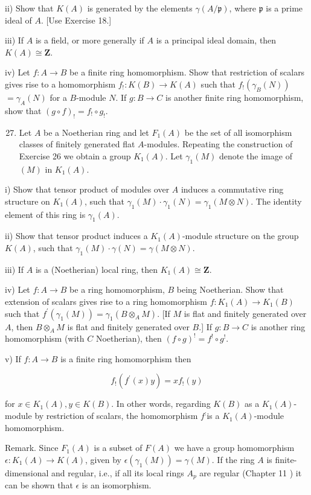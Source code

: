 \documentclass{standalone}
\theoremstyle{definition}
\theoremstyle{remark}
\begin{document}
ii) Show that $K(A)$ is generated by the elements $\gamma(A / \mathfrak{p})$, where $\mathfrak{p}$ is a prime ideal of $A$. [Use Exercise 18.]

iii) If $A$ is a field, or more generally if $A$ is a principal ideal domain, then $K(A) \cong \mathbf{Z}$.

iv) Let $f: A \rightarrow B$ be a finite ring homomorphism. Show that restriction of scalars gives rise to a homomorphism $f_{!}: K(B) \rightarrow K(A)$ such that $f_{!}\left(\gamma_{B}(N)\right)$ $=\gamma_{A}(N)$ for a $B$-module $N$. If $g: B \rightarrow C$ is another finite ring homomorphism, show that $(g \circ f)_{!}=f_{!} \circ g_{!}$.

\begin{enumerate}
  \setcounter{enumi}{26}
  \item Let $A$ be a Noetherian ring and let $F_{1}(A)$ be the set of all isomorphism classes of finitely generated flat $A$-modules. Repeating the construction of Exercise 26 we obtain a group $K_{1}(A)$. Let $\gamma_{1}(M)$ denote the image of $(M)$ in $K_{1}(A)$.
\end{enumerate}

i) Show that tensor product of modules over $A$ induces a commutative ring structure on $K_{1}(A)$, such that $\gamma_{1}(M) \cdot \gamma_{1}(N)=\gamma_{1}(M \otimes N)$. The identity element of this ring is $\gamma_{1}(A)$.

ii) Show that tensor product induces a $K_{1}(A)$-module structure on the group $K(A)$, such that $\gamma_{1}(M) \cdot \gamma(N)=\gamma(M \otimes N)$.

iii) If $A$ is a (Noetherian) local ring, then $K_{1}(A) \cong \mathbf{Z}$.

iv) Let $f: A \rightarrow B$ be a ring homomorphism, $B$ being Noetherian. Show that extension of scalars gives rise to a ring homomorphism $f: K_{1}(A) \rightarrow K_{1}(B)$ such that $f^{\prime}\left(\gamma_{1}(M)\right)=\gamma_{1}\left(B \otimes_{A} M\right)$. [If $M$ is flat and finitely generated over $A$, then $B \otimes_{A} M$ is flat and finitely generated over $B$.] If $g: B \rightarrow C$ is another ring homomorphism (with $C$ Noetherian), then $(f \circ g)^{!}=f^{!} \circ g^{!}$.

v) If $f: A \rightarrow B$ is a finite ring homomorphism then

\[
f_{!}\left(f^{\prime}(x) y\right)=x f_{!}(y)
\]

for $x \in K_{1}(A), y \in K(B)$. In other words, regarding $K(B)$ as a $K_{1}(A)$-module by restriction of scalars, the homomorphism $f^{:}$is a $K_{1}(A)$-module homomorphism.

Remark. Since $F_{1}(A)$ is a subset of $F(A)$ we have a group homomorphism $\epsilon: K_{1}(A) \rightarrow K(A)$, given by $\epsilon\left(\gamma_{1}(M)\right)=\gamma(M)$. If the ring $A$ is finite-dimensional and regular, i.e., if all its local rings $A_{p}$ are regular (Chapter 11 ) it can be shown that $\epsilon$ is an isomorphism.
\end{document}
